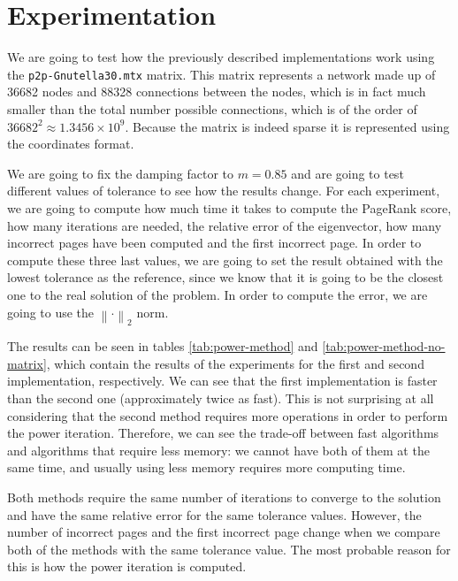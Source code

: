 \documentclass[11pt,a4paper]{article}
\newcommand{\norm}[1]{\left\lVert#1\right\rVert}
\begin{document}
\section{Experimentation}

We are going to test how the previously described implementations work using the \texttt{p2p-Gnutella30.mtx}
matrix. This matrix represents a network made up of 36682 nodes and 88328 connections between the nodes,
which is in fact much smaller than the total number possible connections, which is of the order of
$36682^2 \approx 1.3456 \times 10^9$. Because the matrix is indeed sparse it is represented using the
coordinates format.

We are going to fix the damping factor to $m = 0.85$ and are going to test different values of tolerance
to see how the results change. For each experiment, we are going to compute how much time it takes to
compute the PageRank score, how many iterations are needed, the relative error of the eigenvector,
how many incorrect pages have been computed and the first incorrect page. In order to compute these
three last values, we are going to set the result obtained with the lowest tolerance as the
reference, since we know that it is going to be the closest one to the real solution of the problem.
In order to compute the error, we are going to use the $\norm{\cdot}_2$ norm.

The results can be seen in tables \ref{tab:power-method} and \ref{tab:power-method-no-matrix}, which
contain the results of the experiments for the first and second implementation, respectively. We can
see that the first implementation is faster than the second one (approximately twice as fast). This is not
surprising at all considering that the second method requires more operations in order
to perform the power iteration. Therefore, we can see the trade-off between fast algorithms and
algorithms that require less memory: we cannot have both of them at the same time, and usually using
less memory requires more computing time.

Both methods require the same number of iterations to converge to the solution and have the same relative
error for the same tolerance values. However, the number of incorrect pages and the first incorrect
page change when we compare both of the methods with the same tolerance value. The most probable reason
for this is how the power iteration is computed.
\end{document}
